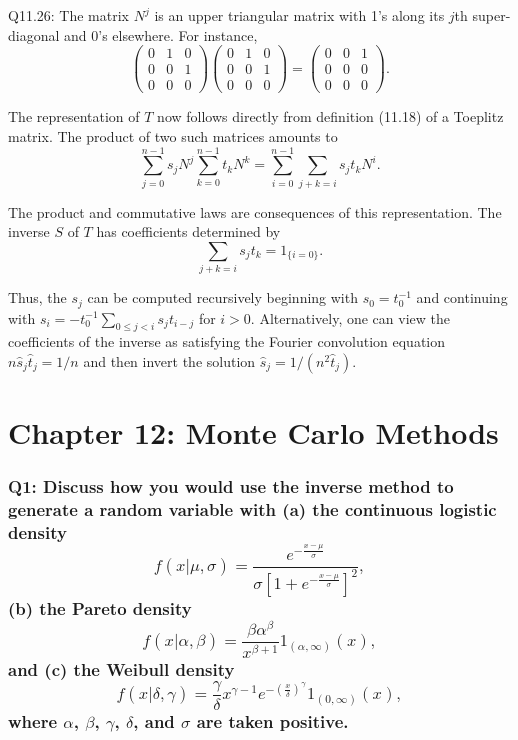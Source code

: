 \documentclass[8pt]{article}
\begin{document}
Q11.26: The matrix \(N^j\) is an upper triangular matrix with 1's along its \(j\)th super-diagonal and 0's elsewhere. For instance,
\[
\begin{pmatrix}
0 & 1 & 0 \\
0 & 0 & 1 \\
0 & 0 & 0
\end{pmatrix}
\begin{pmatrix}
0 & 1 & 0 \\
0 & 0 & 1 \\
0 & 0 & 0
\end{pmatrix}
=
\begin{pmatrix}
0 & 0 & 1 \\
0 & 0 & 0 \\
0 & 0 & 0
\end{pmatrix}.
\]

\noindent The representation of \(T\) now follows directly from definition (11.18) of a Toeplitz matrix. The product of two such matrices amounts to
\[
\sum_{j=0}^{n-1} s_j N^j \sum_{k=0}^{n-1} t_k N^k = \sum_{i=0}^{n-1} \sum_{j+k=i} s_j t_k N^i.
\]

\noindent The product and commutative laws are consequences of this representation. The inverse \(S\) of \(T\) has coefficients determined by
\[
\sum_{j+k=i} s_j t_k = 1_{\{i=0\}}.
\]

\noindent Thus, the \(s_j\) can be computed recursively beginning with \(s_0 = t_0^{-1}\) and continuing with \(s_i = -t_0^{-1} \sum_{0 \leq j < i} s_j t_{i-j}\) for \(i > 0\). Alternatively, one can view the coefficients of the inverse as satisfying the Fourier convolution equation \(n\hat{s}_j \hat{t}_j = 1 / n\) and then invert the solution \(\hat{s}_j = 1 / (n^2 \hat{t}_j)\).

\newpage
\section*{Chapter 12: Monte Carlo Methods}

\subsubsection*{Q1:
Discuss how you would use the inverse method to generate a random variable with (a) the continuous logistic density
\[
f(x|\mu, \sigma) = \frac{e^{-\frac{x-\mu}{\sigma}}}{\sigma [1 + e^{-\frac{x-\mu}{\sigma}}]^2},
\]
(b) the Pareto density
\[
f(x|\alpha, \beta) = \frac{\beta \alpha^\beta}{x^{\beta+1}} 1_{(\alpha, \infty)}(x),
\]
and (c) the Weibull density
\[
f(x|\delta, \gamma) = \frac{\gamma}{\delta} x^{\gamma-1} e^{-\left(\frac{x}{\delta}\right)^\gamma} 1_{(0, \infty)}(x),
\]
where \(\alpha\), \(\beta\), \(\gamma\), \(\delta\), and \(\sigma\) are taken positive.}
\end{document}
